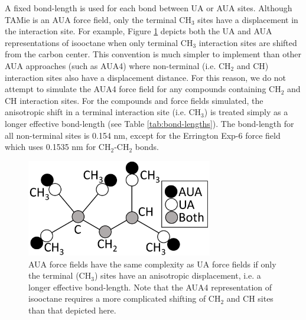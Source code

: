 \documentclass[preprint,letterpaper,floatfix,citeautoscript,aip,jcp]{revtex4-1}
\begin{document}
A fixed bond-length is used for each bond between UA or AUA sites. Although TAMie is an AUA force field, only the terminal CH$_3$ sites have a displacement in the interaction site. For example, Figure \ref{fig:AUA_isooctane} depicts both the UA and AUA representations of isooctane when only terminal CH$_3$ interaction sites are shifted from the carbon center. This convention is much simpler to implement than other AUA approaches (such as AUA4) where non-terminal (i.e. CH$_2$ and CH) interaction sites also have a displacement distance. For this reason, 
we do not attempt to simulate the AUA4 force field for any compounds containing CH$_2$ and CH interaction sites. For the compounds and force fields simulated, the anisotropic shift in a terminal interaction site (i.e. CH$_3$) is treated simply as a longer effective bond-length (see Table \ref{tab:bond-lengths}). The bond-length for all non-terminal sites is 0.154 nm, except for the Errington Exp-6 force field which uses 0.1535 nm for CH$_2$-CH$_2$ bonds.

\begin{figure}[htb!]
	\centering
	\includegraphics[width=3.2in]{AUA_isooctane}
	\caption{AUA force fields have the same complexity as UA force fields if only the terminal (CH$_3$) sites have an anisotropic displacement, i.e. a longer effective bond-length. Note that the AUA4 representation of isooctane requires a more complicated shifting of CH$_2$ and CH sites than that depicted here.}
	\label{fig:AUA_isooctane}
\end{figure}
\end{document}
